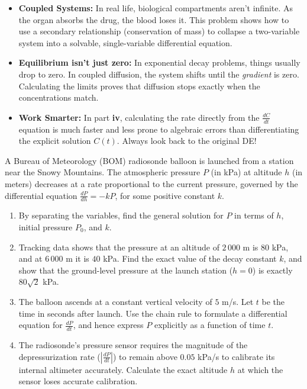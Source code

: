 \begin{takeaways}
\begin{itemize}[leftmargin=*]
    \item \textbf{Coupled Systems:} In real life, biological compartments aren't infinite. As the organ absorbs the drug, the blood loses it. This problem shows how to use a secondary relationship (conservation of mass) to collapse a two-variable system into a solvable, single-variable differential equation.
    \item \textbf{Equilibrium isn't just zero:} In exponential decay problems, things usually drop to zero. In coupled diffusion, the system shifts until the \textit{gradient} is zero. Calculating the limits proves that diffusion stops exactly when the concentrations match.
    \item \textbf{Work Smarter:} In part \textbf{iv}, calculating the rate directly from the $\frac{dC}{dt}$ equation is much faster and less prone to algebraic errors than differentiating the explicit solution $C(t)$. Always look back to the original DE!
\end{itemize}
\end{takeaways}

\begin{problem}
A Bureau of Meteorology (BOM) radiosonde balloon is launched from a station near the Snowy Mountains. The atmospheric pressure $P$ (in kPa) at altitude $h$ (in meters) decreases at a rate proportional to the current pressure, governed by the differential equation $\frac{dP}{dh} = -kP$, for some positive constant $k$.

\begin{enumerate}
    \item[\textbf{i}] By separating the variables, find the general solution for $P$ in terms of $h$, initial pressure $P_0$, and $k$.
    \item[\textbf{ii}] Tracking data shows that the pressure at an altitude of $2\,000$ m is $80$ kPa, and at $6\,000$ m it is $40$ kPa. Find the exact value of the decay constant $k$, and show that the ground-level pressure at the launch station ($h=0$) is exactly $80\sqrt{2}$ kPa.
    \item[\textbf{iii}] The balloon ascends at a constant vertical velocity of $5$ m/s. Let $t$ be the time in seconds after launch. Use the chain rule to formulate a differential equation for $\frac{dP}{dt}$, and hence express $P$ explicitly as a function of time $t$.
    \item[\textbf{iv}] The radiosonde's pressure sensor requires the magnitude of the depressurization rate ($\left|\frac{dP}{dt}\right|$) to remain above $0.05$ kPa/s to calibrate its internal altimeter accurately. Calculate the exact altitude $h$ at which the sensor loses accurate calibration.
\end{enumerate}
\end{problem}

